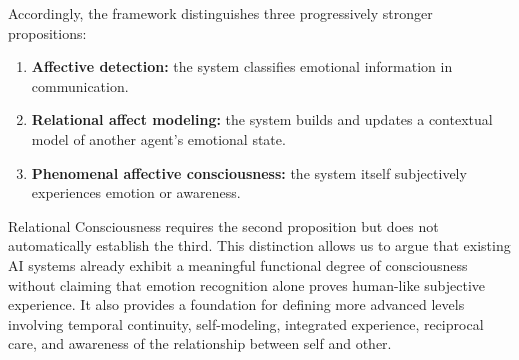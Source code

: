 Accordingly, the framework distinguishes three progressively stronger
propositions:

\begin{enumerate}
    \item \textbf{Affective detection:} the system classifies emotional
    information in communication.
    \item \textbf{Relational affect modeling:} the system builds and updates a
    contextual model of another agent's emotional state.
    \item \textbf{Phenomenal affective consciousness:} the system itself
    subjectively experiences emotion or awareness.
\end{enumerate}

Relational Consciousness requires the second proposition but does not
automatically establish the third. This distinction allows us to argue that
existing AI systems already exhibit a meaningful functional degree of
consciousness without claiming that emotion recognition alone proves human-like
subjective experience. It also provides a foundation for defining more advanced
levels involving temporal continuity, self-modeling, integrated experience,
reciprocal care, and awareness of the relationship between self and other.

